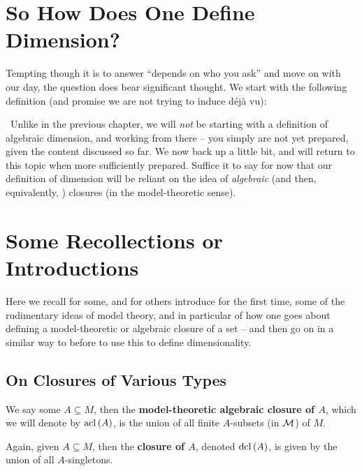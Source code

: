 \section{So How Does One Define Dimension?}
\label{sec:alg_dim}

\noindent Tempting though it is to answer ``depends on who you ask'' and move on with our day, the question does bear significant thought. We start with the following definition (and promise we are not trying to induce d\'ej\`a vu):

\begin{definition}
  \
  Unlike in the previous chapter, we will \emph{not} be starting with a definition of algebraic dimension, and working from there -- you simply are not yet prepared, given the content discussed so far. We now back up a little bit, and will return to this topic when more sufficiently prepared. Suffice it to say for now that our definition of dimension will be reliant on the idea of \emph{algebraic} (and then, equivalently, \emph{}) closures (in the model-theoretic sense).
  \label{defn:alg_dim_fake}
\end{definition}

\section{Some Recollections or Introductions}

Here we recall for some, and for others introduce for the first time, some of the rudimentary ideas of model theory, and in particular of how one goes about defining a model-theoretic or algebraic closure of a set -- and then go on in a similar way to before to use this to define dimensionality.

\subsection{On Closures of Various Types}

\begin{definition}
  We say some $A \subseteq M$, then the \textbf{model-theoretic algebraic closure of $A$}, which we will denote by $\operatorname{acl}\left(A\right)$, is the union of all finite $A$- subsets (in $\mathcal{M}$) of $M$.
\end{definition}

\begin{definition}
  Again, given $A \subseteq M$, then the \textbf{ closure of $A$}, denoted $\operatorname{dcl}\left(A\right)$, is given by the union of all $A$- singletons.
\end{definition}

